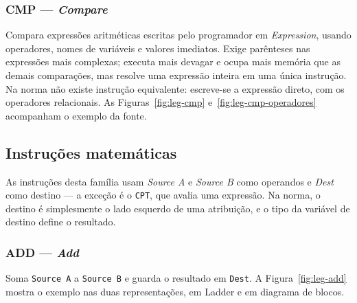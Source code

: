 
\subsubsection{CMP --- \emph{Compare}}

Compara expressões aritméticas escritas pelo programador em \emph{Expression}, usando operadores,
nomes de variáveis e valores imediatos. Exige parênteses nas expressões mais complexas; executa mais
devagar e ocupa mais memória que as demais comparações, mas resolve uma expressão inteira em uma única
instrução. Na norma não existe instrução equivalente: escreve-se a expressão direto, com os operadores
relacionais.
As Figuras~\ref{fig:leg-cmp} e~\ref{fig:leg-cmp-operadores} acompanham o exemplo da fonte.



\subsection{Instruções matemáticas}

As instruções desta família usam \emph{Source A} e \emph{Source B} como operandos e \emph{Dest} como
destino --- a exceção é o \texttt{CPT}, que avalia uma expressão. Na norma, o destino é simplesmente o
lado esquerdo de uma atribuição, e o tipo da variável de destino define o resultado.

\subsubsection{ADD --- \emph{Add}}

Soma \texttt{Source A} a \texttt{Source B} e guarda o resultado em \texttt{Dest}.
A Figura~\ref{fig:leg-add} mostra o exemplo nas duas representações, em Ladder e em diagrama de blocos.


